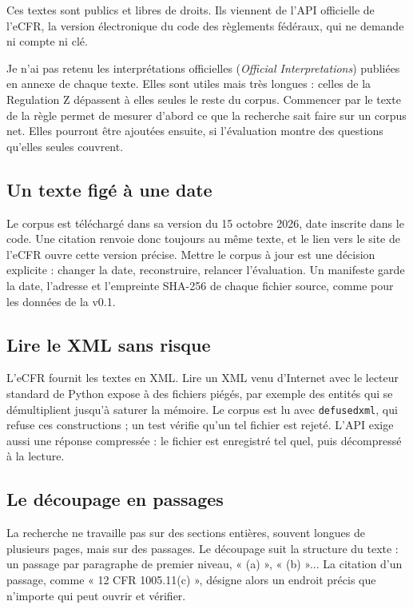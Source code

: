 \documentclass[11pt,a4paper]{article}
\begin{document}
Ces textes sont publics et libres de droits. Ils viennent de l'API officielle de l'eCFR, la version électronique du code des règlements fédéraux, qui ne demande ni compte ni clé.

Je n'ai pas retenu les interprétations officielles (\emph{Official Interpretations}) publiées en annexe de chaque texte. Elles sont utiles mais très longues : celles de la Regulation Z dépassent à elles seules le reste du corpus. Commencer par le texte de la règle permet de mesurer d'abord ce que la recherche sait faire sur un corpus net. Elles pourront être ajoutées ensuite, si l'évaluation montre des questions qu'elles seules couvrent.

\subsection{Un texte figé à une date}

Le corpus est téléchargé dans sa version du 15 octobre 2026, date inscrite dans le code. Une citation renvoie donc toujours au même texte, et le lien vers le site de l'eCFR ouvre cette version précise. Mettre le corpus à jour est une décision explicite : changer la date, reconstruire, relancer l'évaluation. Un manifeste garde la date, l'adresse et l'empreinte SHA-256 de chaque fichier source, comme pour les données de la v0.1.

\subsection{Lire le XML sans risque}

L'eCFR fournit les textes en XML. Lire un XML venu d'Internet avec le lecteur standard de Python expose à des fichiers piégés, par exemple des entités qui se démultiplient jusqu'à saturer la mémoire. Le corpus est lu avec \texttt{defusedxml}, qui refuse ces constructions ; un test vérifie qu'un tel fichier est rejeté. L'API exige aussi une réponse compressée : le fichier est enregistré tel quel, puis décompressé à la lecture.

\subsection{Le découpage en passages}

La recherche ne travaille pas sur des sections entières, souvent longues de plusieurs pages, mais sur des passages. Le découpage suit la structure du texte : un passage par paragraphe de premier niveau, « (a) », « (b) »... La citation d'un passage, comme « 12 CFR 1005.11(c) », désigne alors un endroit précis que n'importe qui peut ouvrir et vérifier.
\end{document}
